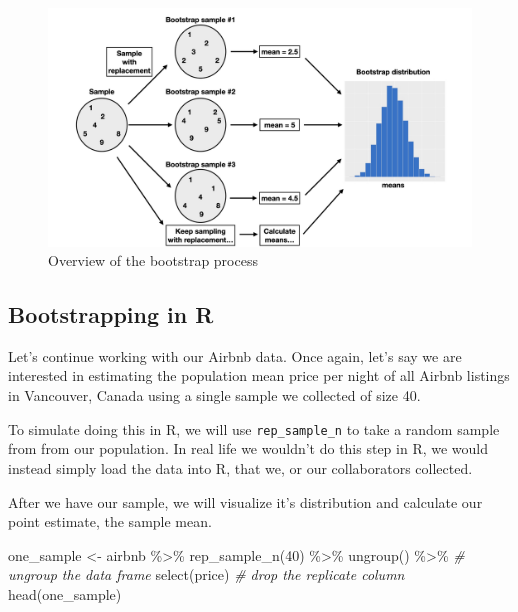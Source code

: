 \documentclass[
]{krantz}
\makeatletter
\newenvironment{Shaded}{\begin{snugshade}}{\end{snugshade}}
\newcommand{\CommentTok}[1]{\textcolor[rgb]{0.37,0.37,0.37}{\textit{#1}}}
\newcommand{\DecValTok}[1]{\textcolor[rgb]{0.06,0.06,0.06}{#1}}
\newcommand{\FunctionTok}[1]{\textcolor[rgb]{0,0,0}{#1}}
\newcommand{\NormalTok}[1]{#1}
\newcommand{\OtherTok}[1]{\textcolor[rgb]{0.37,0.37,0.37}{#1}}
\newcommand{\SpecialCharTok}[1]{\textcolor[rgb]{0,0,0}{#1}}
\newenvironment{kframe}{%
\medskip{}
\setlength{\fboxsep}{.8em}
 \def\at@end@of@kframe{}%
 \ifinner\ifhmode%
  \def\at@end@of@kframe{\end{minipage}}%
  \begin{minipage}{\columnwidth}%
 \fi\fi%
 \def\FrameCommand##1{\hskip\@totalleftmargin \hskip-\fboxsep
 \colorbox{shadecolor}{##1}\hskip-\fboxsep
     \hskip-\linewidth \hskip-\@totalleftmargin \hskip\columnwidth}%
 \MakeFramed {\advance\hsize-\width
   \@totalleftmargin\z@ \linewidth\hsize
   \@setminipage}}%
 {\par\unskip\endMakeFramed%
 \at@end@of@kframe}
\renewenvironment{Shaded}{\begin{kframe}}{\end{kframe}}
\makeatother
\begin{document}
\begin{figure}
\includegraphics[width=1\linewidth]{img/intro-bootstrap} \caption{Overview of the bootstrap process}\label{fig:11-intro-bootstrap-image}
\end{figure}

\hypertarget{bootstrapping-in-r}{%
\subsection{Bootstrapping in R}\label{bootstrapping-in-r}}

Let's continue working with our Airbnb data. Once again, let's say we are interested in estimating the population mean price per night of all Airbnb listings in
Vancouver, Canada using a single sample we collected of size 40.

To simulate doing this in R, we will use \texttt{rep\_sample\_n} to take a random sample from from our population. In real life we wouldn't do this step in R, we would instead simply load the data into R, that we, or our collaborators collected.

After we have our sample, we will visualize it's distribution and calculate our point estimate, the sample mean.

\begin{Shaded}
\begin{Highlighting}[]
\NormalTok{one\_sample }\OtherTok{\textless{}{-}}\NormalTok{ airbnb }\SpecialCharTok{\%\textgreater{}\%}
  \FunctionTok{rep\_sample\_n}\NormalTok{(}\DecValTok{40}\NormalTok{) }\SpecialCharTok{\%\textgreater{}\%}
  \FunctionTok{ungroup}\NormalTok{() }\SpecialCharTok{\%\textgreater{}\%} \CommentTok{\# ungroup the data frame}
  \FunctionTok{select}\NormalTok{(price) }\CommentTok{\# drop the replicate column}
\FunctionTok{head}\NormalTok{(one\_sample)}
\end{Highlighting}
\end{Shaded}
\end{document}
